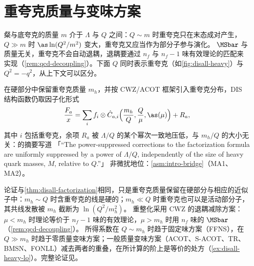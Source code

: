 \section{重夸克质量与变味方案}\label{sec:disall-heavy}

粲与底夸克的质量 $m$ 介于 $\Lambda$ 与 $Q$ 之间：$Q\sim m$ 时重夸克只在末态成对产生，$Q\gg m$ 时 $\as\ln(Q^2/m^2)$ 变大，重夸克又应当作为部分子参与演化。
$\MSbar$ 与质量无关，重夸克不会自动退耦，退耦要通过 $n_f$ 与 $n_f-1$ 味有效理论的匹配来实现（\cref{rem:qcd-decoupling}）。下面 $Q$ 同时表示重夸克（如\cref{fig:disall-heavy}）与 $Q^2=-q^2$，从上下文可以区分。

\begin{theorem}\label{thm:disall-heavy}
在硬部分中保留重夸克质量 $m_h$，并按 CWZ/ACOT 框架引入重夸克分布\cite{CollinsWilczekZee1978,AivazisEtAl1994}，DIS 结构函数仍取因子化形式
\begin{equation}\label{eq:disall-heavy}
\frac{F_a}{x}=\sum_i f_i\otimes\hat C_{a,i}\Big(\frac{m_h}Q,\frac Q\mu,\as(\mu)\Big)+R_a,
\end{equation}
其中 $i$ 包括重夸克，余项 $R_a$ 被 $\Lambda/Q$ 的某个幂次一致地压低，与 $m_h/Q$ 的大小无关：\cite{Collins1998b}的摘要写道
「“The power-suppressed corrections to the factorization formula are uniformly suppressed by a power of $\Lambda/Q$, independently of the size of heavy quark masses, $M$, relative to $Q$.”」
非微扰地位：\cref{asm:intro-bridge}（MA1、MA2）。
\end{theorem}

\begin{proofsketch}
论证与\cref{thm:disall-factorization}相同，只是重夸克质量保留在硬部分与相应的近似子中：$m_h\sim Q$ 时含重夸克的线是硬的；$m_h\ll Q$ 时重夸克也可以是活动部分子，其共线发散被 $m_h$ 截断为 $\ln(Q^2/m_h^2)$。
重整化采用 CWZ 的退耦减除方案\cite{CollinsWilczekZee1978}：$\mu<m_h$ 时理论等价于 $n_f-1$ 味的有效理论，$\mu>m_h$ 时用 $n_f$ 味的 $\MSbar$（\cref{rem:qcd-decoupling}）。
所得系数在 $Q\sim m_h$ 时趋于固定味方案（FFNS），在 $Q\gg m_h$ 时趋于零质量变味方案；一般质量变味方案（ACOT\cite{Aivazis:1993kh,AivazisEtAl1994}、S-ACOT\cite{Kramer:2000hn}、TR\cite{Thorne:1997ga}、
BMSN\cite{Buza:1996wv}、FONLL\cite{Forte:2010ta}）减去两者的重叠，在所计算的阶上是等价的处方（\cref{ex:disall-heavy-lo}）。完整论证见\cite{Collins1998b}。
\end{proofsketch}

